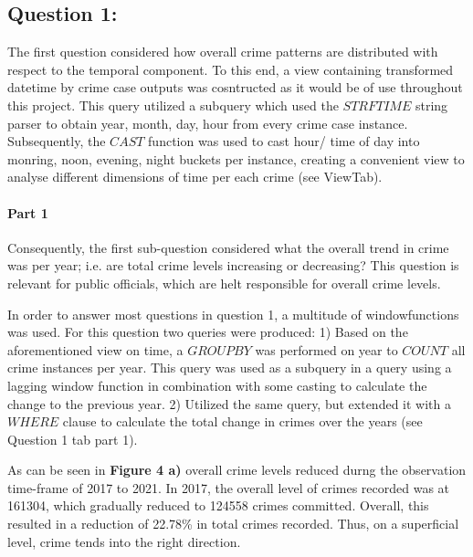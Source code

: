 \documentclass[a4paper]{article}
\begin{document}
\subsection{Question 1:}


The first question considered how overall crime patterns are distributed with respect to the temporal component. To this end, a view containing transformed datetime by crime case  outputs was cosntructed as it would be of use throughout this project. This query utilized a subquery which used the $STRFTIME$ string parser to obtain year, month, day, hour from every crime case instance. Subsequently, the $CAST$ function was used to cast hour/ time of day into monring, noon, evening, night buckets per instance, creating a convenient view to analyse different dimensions of time per each crime (see ViewTab).


\paragraph{Part 1} Consequently, the first sub-question considered what the overall trend in crime was per year; i.e. are total crime levels increasing or decreasing? This question is relevant for public officials, which are helt responsible for overall crime levels. 

In order to answer most questions in question 1, a multitude of windowfunctions was used. For this question two queries were produced: 1) Based on the aforementioned view on time, a $GROUP BY$ was performed on year to $COUNT$ all crime instances per year. This query was used as a subquery in a query using a lagging window function in combination with some casting to calculate the change to the previous year. 2) Utilized the same query, but extended it with a $WHERE$ clause to calculate the total change in crimes over the years (see Question 1 tab part 1).

As can be seen in \textbf{Figure 4 a)} overall crime levels reduced durng the observation time-frame of 2017 to 2021. In 2017, the overall level of crimes recorded was at 161304, which gradually reduced to 124558 crimes committed. Overall, this resulted in a reduction of 22.78\% in total crimes recorded. Thus, on a superficial level, crime tends into the right direction. 
\end{document}

